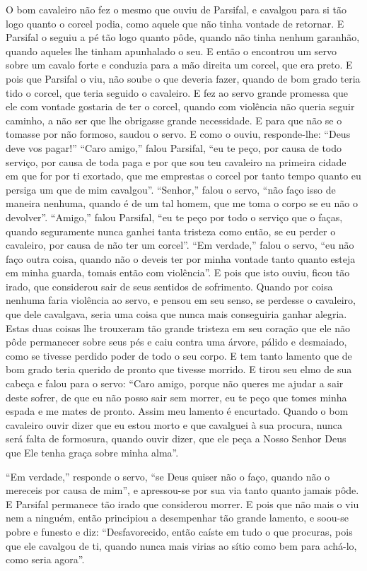 O bom cavaleiro não fez o mesmo que ouviu de Parsifal, e cavalgou para si
tão logo quanto o corcel podia, como aquele que não tinha vontade de retornar.
E Parsifal o seguiu a pé tão logo quanto pôde, quando não tinha nenhum
garanhão, quando aqueles lhe tinham apunhalado o seu. E então o encontrou um
servo sobre um cavalo forte e conduzia para a mão direita um corcel, que era
preto. E pois que Parsifal o viu, não soube o que deveria fazer, quando de bom
grado teria tido o corcel, que teria seguido o cavaleiro. E fez ao servo grande
promessa que ele com vontade gostaria de ter o corcel, quando com violência não
queria seguir caminho, a não ser que lhe obrigasse grande necessidade. E para
que não se o tomasse por não formoso, saudou o servo. E como o ouviu,
responde-lhe: “Deus deve vos pagar!” “Caro amigo,” falou Parsifal, “eu te
peço, por causa de todo serviço, por causa de toda paga e por que sou teu
cavaleiro na primeira cidade em que for por ti exortado, que me emprestas o
corcel por tanto tempo quanto eu persiga um que de mim cavalgou”.
“Senhor,” falou o servo, “não faço isso de maneira nenhuma, quando é de um tal
homem, que me toma o corpo se eu não o devolver”. “Amigo,” falou Parsifal, “eu
te peço por todo o serviço que o faças, quando seguramente nunca ganhei tanta
tristeza como então, se eu perder o cavaleiro, por causa de não ter um corcel”.
“Em verdade,” falou o servo, “eu não faço outra coisa, quando não o deveis ter
por minha vontade tanto quanto esteja em minha guarda, tomais então com
violência”. E pois que isto ouviu, ficou tão irado, que considerou sair de seus
sentidos de sofrimento. Quando por coisa nenhuma faria violência ao servo, e
pensou em seu senso, se perdesse o cavaleiro, que dele cavalgava, seria uma
coisa que nunca mais conseguiria ganhar alegria. Estas duas coisas lhe
trouxeram tão grande tristeza em seu coração que ele não pôde permanecer sobre
seus pés e caiu contra uma árvore, pálido e desmaiado, como se tivesse perdido
poder de todo o seu corpo. E tem tanto lamento que de bom grado teria querido
de pronto que tivesse morrido. E tirou seu elmo de sua cabeça e falou para o
servo: “Caro amigo, porque não queres me ajudar a sair deste sofrer, de que eu
não posso sair sem morrer, eu te peço que tomes minha espada e me mates de
pronto. Assim meu lamento é encurtado. Quando o bom cavaleiro ouvir dizer que
eu estou morto e que cavalguei à sua procura, nunca será falta de formosura,
quando ouvir dizer, que ele peça a Nosso Senhor Deus que Ele tenha graça sobre
minha alma”. 

“Em verdade,” responde o servo, “se Deus quiser não o faço, quando não o
mereceis por causa de mim”, e apressou-se por sua via tanto quanto jamais pôde.
E Parsifal permanece tão irado que considerou morrer. E pois que não mais o
viu nem a ninguém, então principiou a desempenhar tão grande lamento, e soou-se
pobre e funesto e diz: “Desfavorecido, então caíste em tudo o que procuras,
pois que ele cavalgou de ti, quando nunca mais virias ao sítio como bem para
achá-lo, como seria agora”. 


